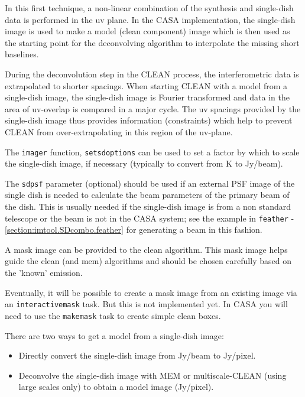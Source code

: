 \vspace{3mm}

In this first technique, a non-linear combination of the synthesis and
single-dish data is performed in the uv plane. In the CASA
implementation, the single-dish image is used to make a model (clean
component) image which is then used as the starting point for the
deconvolving algorithm to interpolate the missing short baselines.

During the deconvolution step in the CLEAN process, the
interferometric data is extrapolated to shorter spacings.  When
starting CLEAN with a model from a single-dish image, the single-dish
image is Fourier transformed and data in the area of uv-overlap is
compared in a major cycle.  The uv spacings provided by the
single-dish image thus provides information (constraints) which help
to prevent CLEAN from over-extrapolating in this region of the
uv-plane.

The {\tt imager} function, {\tt setsdoptions} can be used to set a
factor by which to scale the single-dish image, if necessary
(typically to convert from K to Jy/beam).

The {\tt sdpsf} parameter (optional) should be used if an external PSF
image of the single dish is needed to calculate the beam parameters of
the primary beam of the dish. This is usually needed if the
single-dish image is from a non standard telescope or the beam is not
in the CASA system; see the example in {\tt feather} -
\ref{section:imtool.SDcombo.feather} for generating a beam in this fashion.

A mask image can be provided to the clean algorithm. This mask image
helps guide the clean (and mem) algorithms and should be chosen
carefully based on the 'known' emission.  

Eventually, it will be possible to create a mask image from an
existing image via an {\tt interactivemask} task.  But this is not
implemented yet.  In CASA you will need to use the {\tt makemask} task
to create simple clean boxes.

There are two ways to get a model from a single-dish image:

\begin{itemize}
\item Directly convert the single-dish image from Jy/beam to Jy/pixel.
\item Deconvolve the single-dish image with MEM or multiscale-CLEAN
      (using large scales only) to obtain a model image (Jy/pixel). 
\end{itemize}

